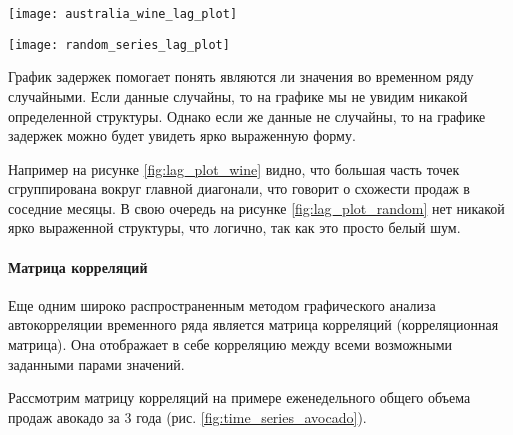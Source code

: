 \begin{center}
    \begin{minipage}{0.45\textwidth}
        \centering
        \texttt{[image: australia\_wine\_lag\_plot]}
        \label{fig:lag_plot_wine}
    \end{minipage}
    \hfill
    \begin{minipage}{0.45\textwidth}
        \centering
        \texttt{[image: random\_series\_lag\_plot]}
        \label{fig:lag_plot_random}
    \end{minipage}
\end{center}

График задержек помогает понять являются ли значения во временном ряду случайными. Если 
данные случайны, то на графике мы не увидим никакой определенной структуры. Однако 
если же данные не случайны, то на графике задержек можно будет увидеть ярко 
выраженную форму. 

Например на рисунке \ref{fig:lag_plot_wine} видно, что большая часть точек 
сгруппирована вокруг главной диагонали, что говорит о схожести продаж в соседние месяцы. 
В свою очередь на рисунке \ref{fig:lag_plot_random} нет никакой ярко выраженной 
структуры, что логично, так как это просто белый шум. \\

\paragraph{Матрица корреляций}

Еще одним широко распространенным методом графического анализа автокорреляции 
временного ряда является матрица корреляций (корреляционная матрица). Она отображает в 
себе корреляцию между всеми возможными заданными парами значений.

Рассмотрим матрицу корреляций на примере еженедельного общего объема продаж авокадо 
за 3 года (рис. \ref{fig:time_series_avocado}).

